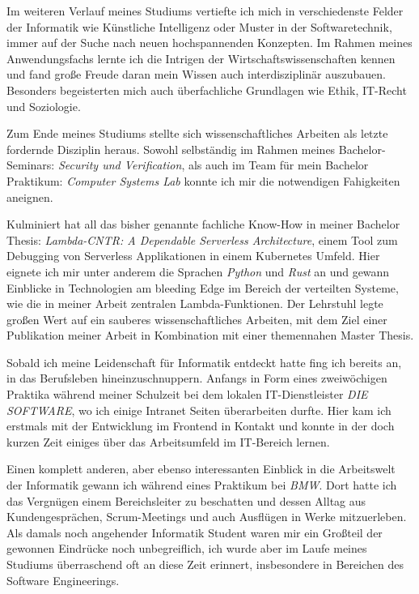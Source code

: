\documentclass[11pt, a4paper]{awesome-cv}
\begin{document}
\begin{cvletter}
  Im weiteren Verlauf meines Studiums vertiefte ich mich in verschiedenste Felder der Informatik wie Künstliche Intelligenz oder Muster in der Softwaretechnik, immer auf der Suche nach neuen hochspannenden Konzepten. Im Rahmen meines Anwendungsfachs lernte ich die Intrigen der Wirtschaftswissenschaften kennen und fand große Freude daran mein Wissen auch interdisziplinär auszubauen. Besonders begeisterten mich auch überfachliche Grundlagen wie Ethik, IT-Recht und Soziologie.


  Zum Ende meines Studiums stellte sich wissenschaftliches Arbeiten als letzte fordernde Disziplin heraus. Sowohl selbständig im Rahmen meines Bachelor-Seminars: \textit{Security und Verification}, als auch im Team für mein Bachelor Praktikum: \textit{Computer Systems Lab} konnte ich mir die notwendigen Fahigkeiten aneignen.


  Kulminiert hat all das bisher genannte fachliche Know-How in meiner Bachelor Thesis:  \textit{Lambda-CNTR: A Dependable Serverless Architecture}, einem Tool zum Debugging von Serverless Applikationen in einem Kubernetes Umfeld. Hier eignete ich mir unter anderem die Sprachen \textit{Python} und \textit{Rust} an und gewann Einblicke in Technologien am bleeding Edge im Bereich der verteilten Systeme, wie die in meiner Arbeit zentralen Lambda-Funktionen.
  Der Lehrstuhl legte großen Wert auf ein sauberes wissenschaftliches Arbeiten, mit dem Ziel einer Publikation meiner Arbeit in Kombination mit einer themennahen Master Thesis.



  Sobald ich meine Leidenschaft für Informatik entdeckt hatte fing ich bereits an, in das Berufsleben hineinzuschnuppern. Anfangs in Form eines zweiwöchigen Praktika während meiner Schulzeit bei dem lokalen IT-Dienstleister \textit{DIE SOFTWARE}, wo ich einige Intranet Seiten überarbeiten durfte. Hier kam ich erstmals mit der Entwicklung im Frontend in Kontakt und konnte in der doch kurzen Zeit einiges über das Arbeitsumfeld im IT-Bereich lernen.

  Einen komplett anderen, aber ebenso interessanten Einblick in die Arbeitswelt der Informatik gewann ich während eines Praktikum bei \textit{BMW}. Dort hatte ich das Vergnügen einem Bereichsleiter zu beschatten und dessen Alltag aus Kundengesprächen, Scrum-Meetings und auch Ausflügen in Werke mitzuerleben. Als damals noch angehender Informatik Student waren mir ein Großteil der gewonnen Eindrücke noch unbegreiflich, ich wurde aber im Laufe meines Studiums überraschend oft an diese Zeit erinnert, insbesondere in Bereichen des Software Engineerings.


\end{cvletter}
\end{document}
